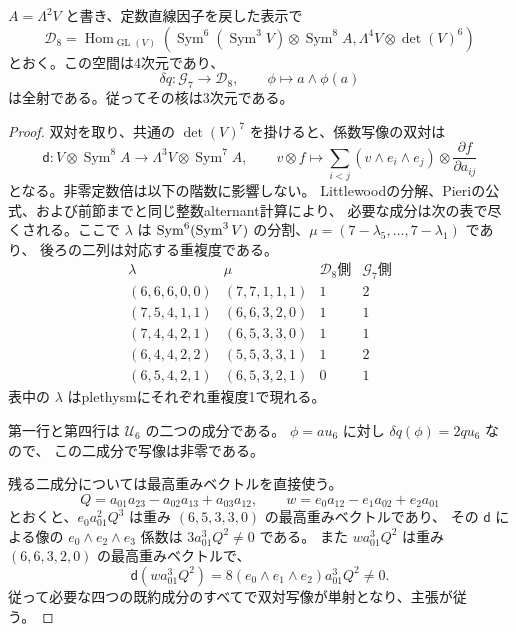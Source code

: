 \begin{proposition}[Pfaffian微分の像]
\label{prop:degree-twelve-pfaffian-image}
$A=\Lambda^2V$ と書き、定数直線因子を戻した表示で
\[
 \mathcal D_8=\operatorname{Hom}_{\operatorname{GL}(V)}
 \left(\operatorname{Sym}^6(\operatorname{Sym}^3V)
       \otimes\operatorname{Sym}^8A,
       \Lambda^4V\otimes\det(V)^6\right)
\]
とおく。この空間は4次元であり、
\[
 \delta q\colon\mathcal G_7\longrightarrow\mathcal D_8,
 \qquad\phi\longmapsto a\wedge\phi(a)
\]
は全射である。従ってその核は3次元である。
\end{proposition}
\begin{proof}
双対を取り、共通の $\det(V)^7$ を掛けると、係数写像の双対は
\[
 \mathsf d\colon V\otimes\operatorname{Sym}^8A
       \longrightarrow\Lambda^3V\otimes\operatorname{Sym}^7A,
 \qquad
 v\otimes f\longmapsto
 \sum_{i<j}(v\wedge e_i\wedge e_j)\otimes
                \frac{\partial f}{\partial a_{ij}}
\]
となる。非零定数倍は以下の階数に影響しない。
Littlewoodの分解、Pieriの公式、および前節までと同じ整数alternant計算により、
必要な成分は次の表で尽くされる。ここで $\lambda$ は
$\operatorname{Sym}^6(\operatorname{Sym}^3V)$ の分割、$\mu=(7-\lambda_5,\ldots,7-\lambda_1)$ であり、
後ろの二列は対応する重複度である。
\[
\begin{array}{c|c|c|c}
 \lambda&\mu&\mathcal D_8\text{側}&\mathcal G_7\text{側}\\ \hline
 (6,6,6,0,0)&(7,7,1,1,1)&1&2\\
 (7,5,4,1,1)&(6,6,3,2,0)&1&1\\
 (7,4,4,2,1)&(6,5,3,3,0)&1&1\\
 (6,4,4,2,2)&(5,5,3,3,1)&1&2\\
 (6,5,4,2,1)&(6,5,3,2,1)&0&1
\end{array}
\]
表中の $\lambda$ はplethysmにそれぞれ重複度1で現れる。

第一行と第四行は $\mathcal U_6$ の二つの成分である。
$\phi=a u_6$ に対し $\delta q(\phi)=2q u_6$ なので、
この二成分で写像は非零である。

残る二成分については最高重みベクトルを直接使う。
\[
 Q=a_{01}a_{23}-a_{02}a_{13}+a_{03}a_{12},
 \qquad w=e_0a_{12}-e_1a_{02}+e_2a_{01}
\]
とおくと、$e_0a_{01}^2Q^3$ は重み $(6,5,3,3,0)$ の最高重みベクトルであり、
その $\mathsf d$ による像の $e_0\wedge e_2\wedge e_3$ 係数は
$3a_{01}^3Q^2\ne0$ である。
また $w a_{01}^3Q^2$ は重み $(6,6,3,2,0)$ の最高重みベクトルで、
\[
 \mathsf d(w a_{01}^3Q^2)
       =8(e_0\wedge e_1\wedge e_2)a_{01}^3Q^2\ne0.
\]
従って必要な四つの既約成分のすべてで双対写像が単射となり、主張が従う。
\end{proof}

